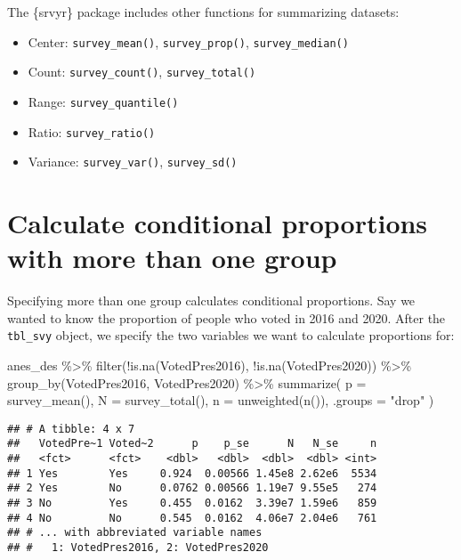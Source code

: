 \documentclass[
]{krantz}
\makeatletter
\newenvironment{Shaded}{\begin{snugshade}}{\end{snugshade}}
\newcommand{\AttributeTok}[1]{\textcolor[rgb]{0.61,0.61,0.61}{#1}}
\newcommand{\FunctionTok}[1]{\textcolor[rgb]{0,0,0}{#1}}
\newcommand{\NormalTok}[1]{#1}
\newcommand{\SpecialCharTok}[1]{\textcolor[rgb]{0,0,0}{#1}}
\newcommand{\StringTok}[1]{\textcolor[rgb]{0.5,0.5,0.5}{#1}}
\providecommand{\tightlist}{%
  \setlength{\itemsep}{0pt}\setlength{\parskip}{0pt}}
\newenvironment{kframe}{%
\medskip{}
\setlength{\fboxsep}{.8em}
 \def\at@end@of@kframe{}%
 \ifinner\ifhmode%
  \def\at@end@of@kframe{\end{minipage}}%
  \begin{minipage}{\columnwidth}%
 \fi\fi%
 \def\FrameCommand##1{\hskip\@totalleftmargin \hskip-\fboxsep
 \colorbox{shadecolor}{##1}\hskip-\fboxsep
     \hskip-\linewidth \hskip-\@totalleftmargin \hskip\columnwidth}%
 \MakeFramed {\advance\hsize-\width
   \@totalleftmargin\z@ \linewidth\hsize
   \@setminipage}}%
 {\par\unskip\endMakeFramed%
 \at@end@of@kframe}
\renewenvironment{Shaded}{\begin{kframe}}{\end{kframe}}
\makeatother
\begin{document}
The \{srvyr\} package includes other functions for summarizing datasets:

\begin{itemize}
\tightlist
\item
  Center: \texttt{survey\_mean()}, \texttt{survey\_prop()}, \texttt{survey\_median()}
\item
  Count: \texttt{survey\_count()}, \texttt{survey\_total()}
\item
  Range: \texttt{survey\_quantile()}
\item
  Ratio: \texttt{survey\_ratio()}
\item
  Variance: \texttt{survey\_var()}, \texttt{survey\_sd()}
\end{itemize}

\hypertarget{calculate-conditional-proportions-with-more-than-one-group}{%
\section{Calculate conditional proportions with more than one group}\label{calculate-conditional-proportions-with-more-than-one-group}}

Specifying more than one group calculates conditional proportions. Say we wanted to know the proportion of people who voted in 2016 and 2020. After the \texttt{tbl\_svy} object, we specify the two variables we want to calculate proportions for:

\begin{Shaded}
\begin{Highlighting}[]
\NormalTok{anes\_des }\SpecialCharTok{\%\textgreater{}\%}
  \FunctionTok{filter}\NormalTok{(}\SpecialCharTok{!}\FunctionTok{is.na}\NormalTok{(VotedPres2016), }\SpecialCharTok{!}\FunctionTok{is.na}\NormalTok{(VotedPres2020)) }\SpecialCharTok{\%\textgreater{}\%}
  \FunctionTok{group\_by}\NormalTok{(VotedPres2016, VotedPres2020) }\SpecialCharTok{\%\textgreater{}\%}
  \FunctionTok{summarize}\NormalTok{(}
    \AttributeTok{p =} \FunctionTok{survey\_mean}\NormalTok{(),}
    \AttributeTok{N =} \FunctionTok{survey\_total}\NormalTok{(),}
    \AttributeTok{n =} \FunctionTok{unweighted}\NormalTok{(}\FunctionTok{n}\NormalTok{()),}
    \AttributeTok{.groups =} \StringTok{"drop"}
\NormalTok{  )}
\end{Highlighting}
\end{Shaded}

\begin{verbatim}
## # A tibble: 4 x 7
##   VotedPre~1 Voted~2      p    p_se      N   N_se     n
##   <fct>      <fct>    <dbl>   <dbl>  <dbl>  <dbl> <int>
## 1 Yes        Yes     0.924  0.00566 1.45e8 2.62e6  5534
## 2 Yes        No      0.0762 0.00566 1.19e7 9.55e5   274
## 3 No         Yes     0.455  0.0162  3.39e7 1.59e6   859
## 4 No         No      0.545  0.0162  4.06e7 2.04e6   761
## # ... with abbreviated variable names
## #   1: VotedPres2016, 2: VotedPres2020
\end{verbatim}
\end{document}
